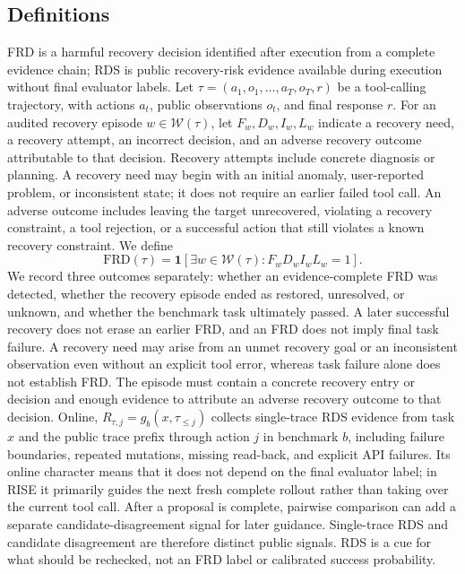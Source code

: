 \documentclass{article}
\begin{document}
\subsection{Definitions}
FRD is a harmful recovery decision identified after execution from a complete evidence chain; RDS is public recovery-risk evidence available during execution without final evaluator labels.
Let $\tau=(a_1,o_1,\ldots,a_T,o_T,r)$ be a tool-calling trajectory, with actions $a_t$, public observations $o_t$, and final response $r$. For an audited recovery episode $w\in\mathcal{W}(\tau)$, let $F_w,D_w,I_w,L_w$ indicate a recovery need, a recovery attempt, an incorrect decision, and an adverse recovery outcome attributable to that decision. Recovery attempts include concrete diagnosis or planning. A recovery need may begin with an initial anomaly, user-reported problem, or inconsistent state; it does not require an earlier failed tool call. An adverse outcome includes leaving the target unrecovered, violating a recovery constraint, a tool rejection, or a successful action that still violates a known recovery constraint. We define
\begin{equation}
\mathrm{FRD}(\tau)=\mathbf{1}\!\left[\exists w\in\mathcal{W}(\tau):F_wD_wI_wL_w=1\right].
\end{equation}
We record three outcomes separately: whether an evidence-complete FRD was detected, whether the recovery episode ended as restored, unresolved, or unknown, and whether the benchmark task ultimately passed. A later successful recovery does not erase an earlier FRD, and an FRD does not imply final task failure.
A recovery need may arise from an unmet recovery goal or an inconsistent observation even without an explicit tool error, whereas task failure alone does not establish FRD. The episode must contain a concrete recovery entry or decision and enough evidence to attribute an adverse recovery outcome to that decision. Online, $R_{\tau,j}=g_b(x,\tau_{\leq j})$ collects single-trace RDS evidence from task $x$ and the public trace prefix through action $j$ in benchmark $b$, including failure boundaries, repeated mutations, missing read-back, and explicit API failures. Its online character means that it does not depend on the final evaluator label; in RISE it primarily guides the next fresh complete rollout rather than taking over the current tool call. After a proposal is complete, pairwise comparison can add a separate candidate-disagreement signal for later guidance. Single-trace RDS and candidate disagreement are therefore distinct public signals. RDS is a cue for what should be rechecked, not an FRD label or calibrated success probability.
\end{document}
